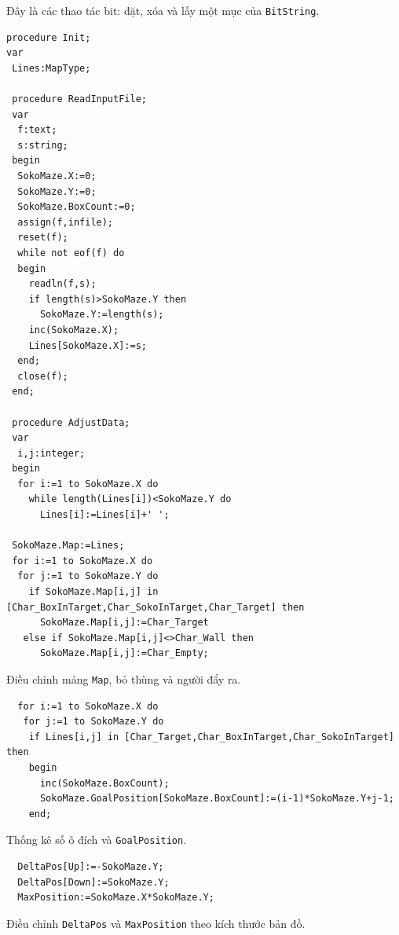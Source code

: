 \documentclass[11pt]{article}
\begin{document}
Đây là các thao tác bit: đặt, xóa và lấy một mục của \texttt{BitString}.

\begin{verbatim}
procedure Init;
var
 Lines:MapType;

 procedure ReadInputFile;
 var
  f:text;
  s:string;
 begin
  SokoMaze.X:=0;
  SokoMaze.Y:=0;
  SokoMaze.BoxCount:=0;
  assign(f,infile);
  reset(f);
  while not eof(f) do
  begin
    readln(f,s);
    if length(s)>SokoMaze.Y then
      SokoMaze.Y:=length(s);
    inc(SokoMaze.X);
    Lines[SokoMaze.X]:=s;
  end;
  close(f);
 end;

 procedure AdjustData;
 var
  i,j:integer;
 begin
  for i:=1 to SokoMaze.X do
    while length(Lines[i])<SokoMaze.Y do
      Lines[i]:=Lines[i]+' ';

 SokoMaze.Map:=Lines;
 for i:=1 to SokoMaze.X do
  for j:=1 to SokoMaze.Y do
    if SokoMaze.Map[i,j] in [Char_BoxInTarget,Char_SokoInTarget,Char_Target] then
      SokoMaze.Map[i,j]:=Char_Target
   else if SokoMaze.Map[i,j]<>Char_Wall then
      SokoMaze.Map[i,j]:=Char_Empty;
\end{verbatim}

Điều chỉnh mảng \texttt{Map}, bỏ thùng và người đẩy ra.

\begin{verbatim}
  for i:=1 to SokoMaze.X do
   for j:=1 to SokoMaze.Y do
    if Lines[i,j] in [Char_Target,Char_BoxInTarget,Char_SokoInTarget] then
    begin
      inc(SokoMaze.BoxCount);
      SokoMaze.GoalPosition[SokoMaze.BoxCount]:=(i-1)*SokoMaze.Y+j-1;
    end;
\end{verbatim}

Thống kê số ô đích và \texttt{GoalPosition}.

\begin{verbatim}
  DeltaPos[Up]:=-SokoMaze.Y;
  DeltaPos[Down]:=SokoMaze.Y;
  MaxPosition:=SokoMaze.X*SokoMaze.Y;
\end{verbatim}

Điều chỉnh \texttt{DeltaPos} và \texttt{MaxPosition} theo kích thước bản đồ.
\end{document}
